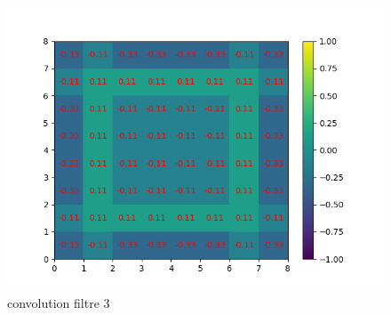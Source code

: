 \begin{figure}[h]
        \includegraphics[width=\textwidth]{img/cnn_exemple/square/convolution_filtre_3.png}
        \caption{convolution filtre 3}
    \endminipage
\end{figure}

\newpage

